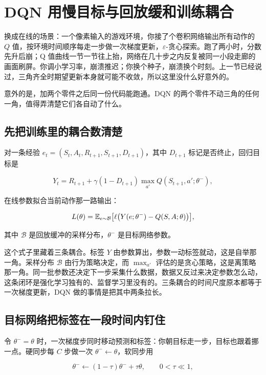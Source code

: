 \section{DQN 用慢目标与回放缓和训练耦合}
\label{sec:16-Control-and-Reinforcement-Learning/02-Reinforcement-Learning/07}

换成在线的场景：一个像素输入的游戏环境，你接了个卷积网络输出所有动作的 \(Q\) 值，按环境时间顺序每走一步做一次梯度更新，\(\varepsilon\)-贪心探索。跑了两小时，分数先升后崩；Q 值曲线一节一节往上抬，网络在几十步之内反复被同一小段走廊的画面刷屏。你调小学习率，崩溃推迟；你换个种子，崩溃换个时刻。上一节已经说过，三角齐全时期望更新本身就可能不收敛，所以这里没什么好意外的。

意外的是，加两个零件之后同一份代码能跑通。DQN 的两个零件不动三角的任何一角，值得弄清楚它们各自动了什么。

\subsection{先把训练里的耦合数清楚}

对一条经验 \(e_t=(S_t,A_t,R_{t+1},S_{t+1},D_{t+1})\)，其中 \(D_{t+1}\) 标记是否终止，回归目标是

\[
Y_t=R_{t+1}+\gamma(1-D_{t+1})\max_{a'}Q(S_{t+1},a';\theta^-),
\]

在线参数拟合当前动作那一路输出：

\[
L(\theta)=\mathbb{E}_{e\sim\mathcal B}\big[\ell\big(Y(e;\theta^-)-Q(S,A;\theta)\big)\big],
\]

其中 \(\mathcal B\) 是回放缓冲的采样分布，\(\theta^-\) 是目标网络参数。

这个式子里藏着三条耦合。标签 \(Y\) 由参数算出，参数一动标签就动，这是自举那一角。采样分布 \(\mathcal B\) 由行为策略决定，而 \(\max_{a'}\) 评估的是贪心策略，这是离策略那一角。同一批参数还决定下一步采集什么数据，数据又反过来决定参数怎么动，这条闭环是强化学习独有的、监督学习里没有的。三条耦合的时间尺度原本都等于一次梯度更新，DQN 做的事情是把其中两条拉长。

\subsection{目标网络把标签在一段时间内钉住}

令 \(\theta^-=\theta\) 时，一次梯度步同时移动预测和标签：你朝目标走一步，目标也跟着挪一点。硬同步每 \(C\) 步做一次 \(\theta^-\leftarrow\theta\)，软同步用

\[
\theta^-\leftarrow(1-\tau)\theta^-+\tau\theta,\qquad 0<\tau\ll1,
\]

